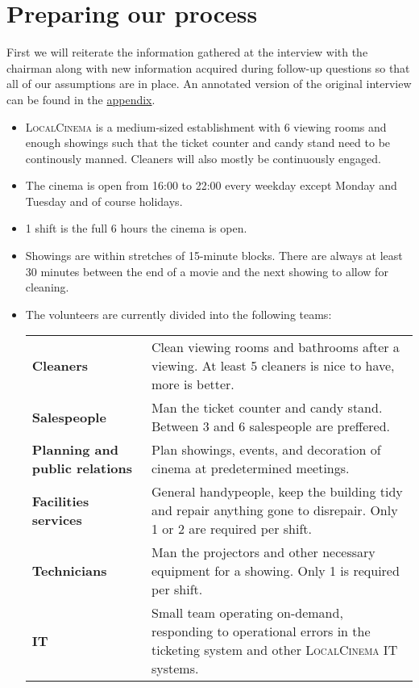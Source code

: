 \chapter{Preparing our process}

First we will reiterate the information gathered at the interview with the chairman
along with new information acquired during follow-up questions
so that all of our assumptions are in place.
An annotated version of the original interview can be found in the \hyperref[appendix:interview]{appendix}.

\begin{itemize}
	\item \textsc{LocalCinema} is a medium-sized establishment
	      with 6 viewing rooms and enough showings
	      such that the ticket counter and candy stand need to be continously manned.
	      Cleaners will also mostly be continuously engaged.

	\item The cinema is open from 16:00 to 22:00
	      every weekday except Monday and Tuesday
	      and of course holidays.

	\item 1 shift is the full 6 hours the cinema is open.

	\item Showings are within stretches of 15-minute blocks.
	      There are always at least 30 minutes
	      between the end of a movie and the next showing
	      to allow for cleaning.

	\item The volunteers are currently divided into the following teams:

	      \begingroup
	      \begin{tabularx}{0.9\linewidth}{p{8em}X}
		      \bfseries\raggedleft Cleaners                      &
		      Clean viewing rooms and bathrooms after a viewing.
		      At least 5 cleaners is nice to have, more is better.
		      \\
		      \bfseries\raggedleft Salespeople                   &
		      Man the ticket counter and candy stand.
		      Between 3 and 6 salespeople are preffered.
		      \\
		      \bfseries\raggedleft Planning and public relations &
		      Plan showings, events, and decoration of cinema
		      at predetermined meetings.
		      \\
		      \bfseries\raggedleft Facilities services           &
		      General handypeople, keep the building tidy
		      and repair anything gone to disrepair.
		      Only 1 or 2 are required per shift.
		      \\
		      \bfseries\raggedleft Technicians                   &
		      Man the projectors and other necessary equipment for a showing.
		      Only 1 is required per shift.
		      \\
		      \bfseries\raggedleft IT                            &
		      Small team operating on-demand,
		      responding to operational errors in the ticketing system
		      and other \textsc{LocalCinema} IT systems.
	      \end{tabularx}
	      \endgroup


\end{itemize}
